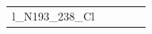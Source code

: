 \documentclass[10pt,notitlepage,letterpaper]{article}
\def\s{\phantom{xx}}
\begin{document}
\begin{tabular}[t]{ c @{\s} c @{\s} c @{\s} c @{\s} c }
l_N193_238_Cl} & 
\end{tabular}
\end{document}
